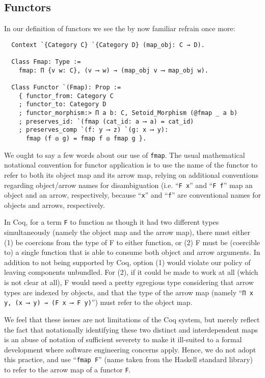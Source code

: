 \documentclass[a4paper,10pt,runningheads]{llncs}
\begin{document}
\subsection{Functors}

In our definition of functors we see the by now familiar refrain once more:
\begin{lstlisting}
  Context `{Category C} `{Category D} (map_obj: C → D).

  Class Fmap: Type :=
    fmap: Π {v w: C}, (v ⟶ w) → (map_obj v ⟶ map_obj w).

  Class Functor `(Fmap): Prop :=
    { functor_from: Category C
    ; functor_to: Category D
    ; functor_morphism:> Π a b: C, Setoid_Morphism (@fmap _ a b)
    ; preserves_id: `(fmap (cat_id: a ⟶ a) = cat_id)
    ; preserves_comp `(f: y ⟶ z) `(g: x ⟶ y):
      fmap (f ◎ g) = fmap f ◎ fmap g }.
\end{lstlisting}
We ought to say a few words about our use of \lstinline|fmap|. The usual mathematical notational convention for functor application is to use the name of the functor to refer to both its object map and its arrow map, relying on additional conventions regarding object/arrow names for disambiguation (i.e. ``\lstinline|F x|'' and ``\lstinline|F f|'' map an object and an arrow, respectively, because ``\lstinline|x|'' and ``\lstinline|f|'' are conventional names for objects and arrows, respectively.

In Coq, for a term \lstinline|F| to function as though it had two different types simultaneously (namely the object map and the arrow map), there must either (1) be coercions from the type of F to either function, or (2) F must be (coercible to) a single function that is able to consume both object and arrow arguments. In addition to not being supported by Coq, option (1) would violate our policy of leaving components unbundled. For (2), if it could be made to work at all (which is not clear at all), F would need a pretty egregious type considering that arrow types are indexed by objects, and that the type of the arrow map (namely ``\lstinline|Π x y, (x ⟶ y) → (F x ⟶ F y)|'') must refer to the object map.

We feel that these issues are not limitations of the Coq system, but merely reflect the fact that notationally identifying these two distinct and interdependent maps is an abuse of notation of sufficient severety to make it ill-suited to a formal development where software engineering concerns apply. Hence, we do not adopt this practice, and use ``\lstinline|fmap F|'' (name taken from the Haskell standard library) to refer to the arrow map of a functor \lstinline|F|.
\end{document}
